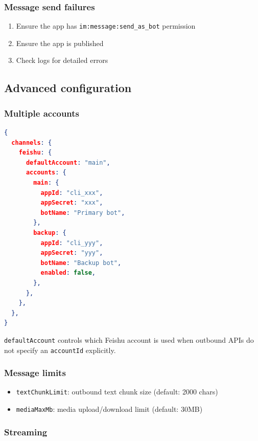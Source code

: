 \subsubsection{Message send failures}


\begin{enumerate}
  \item Ensure the app has \texttt{im:message:send\_as\_bot} permission
  \item Ensure the app is published
  \item Check logs for detailed errors
\end{enumerate}


\hrulefill


\subsection{Advanced configuration}


\subsubsection{Multiple accounts}


\begin{lstlisting}[language=json]
{
  channels: {
    feishu: {
      defaultAccount: "main",
      accounts: {
        main: {
          appId: "cli_xxx",
          appSecret: "xxx",
          botName: "Primary bot",
        },
        backup: {
          appId: "cli_yyy",
          appSecret: "yyy",
          botName: "Backup bot",
          enabled: false,
        },
      },
    },
  },
}
\end{lstlisting}


\texttt{defaultAccount} controls which Feishu account is used when outbound APIs do not specify an \texttt{accountId} explicitly.

\subsubsection{Message limits}


\begin{itemize}
  \item \texttt{textChunkLimit}: outbound text chunk size (default: 2000 chars)
  \item \texttt{mediaMaxMb}: media upload/download limit (default: 30MB)
\end{itemize}


\subsubsection{Streaming}


